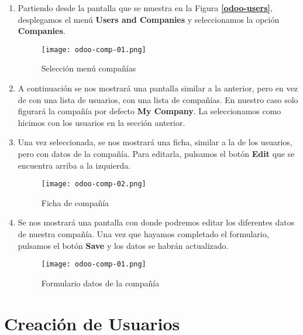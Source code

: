 \begin{enumerate}
    \item Partiendo desde la pantalla que se muestra en la Figura \textbf{\ref{odoo-users}}, desplegamos el menú \textbf{Users and Companies} y seleccionamos la opción \textbf{Companies}.

    \begin{figure}[h]
        \centering
        \texttt{[image: odoo-comp-01.png]}
        \caption{Selección menú compañías}
    \end{figure}

    \item A continuación se nos mostrará una pantalla similar a la anterior, pero en vez de con una lista de usuarios, con una lista de compañías. En nuestro caso solo figurará la compañía por defecto \textbf{My Company}. La seleccionamos como hicimos con los usuarios en la sección anterior.

    \item Una vez seleccionada, se nos mostrará una ficha, similar a la de los usuarios, pero con datos de la compañía. Para editarla, pulsamos el botón \textbf{Edit} que se encuentra arriba a la izquierda.

     \begin{figure}[h]
        \centering
        \texttt{[image: odoo-comp-02.png]}
        \caption{Ficha de compañía}
    \end{figure}

    \item Se nos mostrará una pantalla con donde podremos editar los diferentes datos de nuestra compañía. Una vez que hayamos completado el formulario, pulsamos el botón \textbf{Save} y los datos se habrán actualizado.

        \begin{figure}[h]
        \centering
        \texttt{[image: odoo-comp-01.png]}
        \caption{Formulario datos de la compañía}
    \end{figure}
\end{enumerate}

\section{Creación de Usuarios}







\newpage



